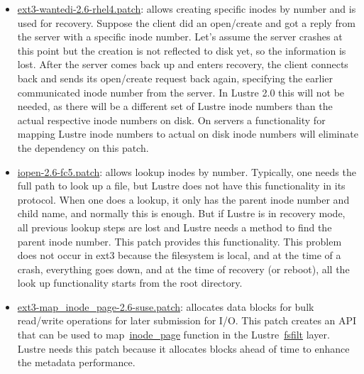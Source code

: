 \begin{itemize}

\item \url{ext3-wantedi-2.6-rhel4.patch}: allows creating specific inodes by
number and is used for recovery. Suppose the client did an open/create and got
a reply from the server with a specific inode number. Let's assume the server
crashes at this point but the creation is not reflected to disk yet, so the
information is lost. After the server comes back up and enters recovery, the
client connects back and sends its open/create request back again, specifying
the earlier communicated inode number from the server. In Lustre 2.0 this will
not be needed, as there will be a different set of Lustre inode numbers than
the actual respective inode numbers on disk. On servers a functionality for
mapping Lustre inode numbers to actual on disk inode numbers will eliminate the
dependency on this patch. 

\item \url{iopen-2.6-fc5.patch}: allows lookup inodes by number. Typically, one
needs the full path to look up a file, but Lustre does not have this
functionality in its protocol. When one does a lookup, it only has the parent
inode number and child name, and normally this is enough. But if Lustre is in
recovery mode, all previous lookup steps are lost and Lustre needs a method to
find the parent inode number. This patch provides this functionality. This
problem does not occur in ext3 because the filesystem is local, and at the time
of a crash, everything goes down, and at the time of recovery (or reboot), all the
look up functionality starts from the root directory.

\item \url{ext3-map_inode_page-2.6-suse.patch}: allocates data blocks for bulk
read/write operations for later submission for I/O. This patch creates an API 
that can be used to map~\url{inode_page} function in the Lustre~\url{fsfilt} layer.
Lustre needs this patch because it allocates blocks ahead of time to enhance the 
metadata performance. 

\end{itemize}

